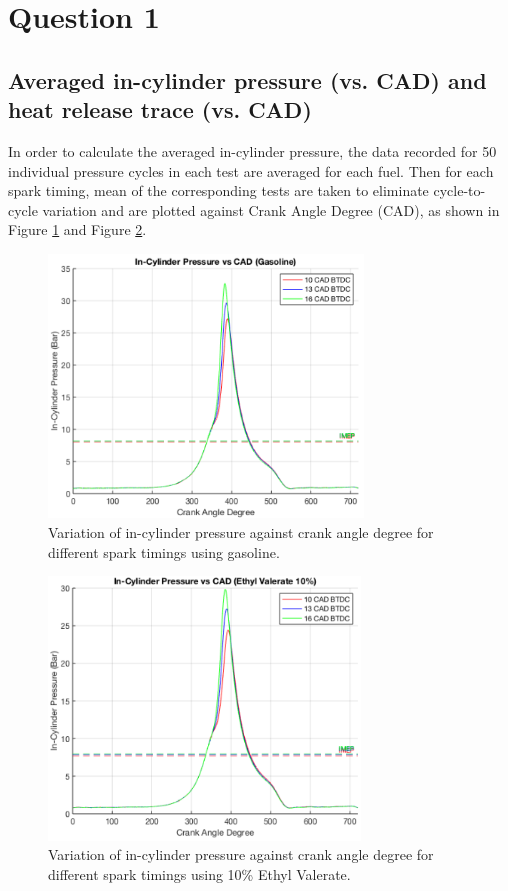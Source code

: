 \documentclass[11pt]{article}
\begin{document}
\section{Question 1}
\subsection*{Averaged in-cylinder pressure (vs. CAD) and heat release trace (vs. CAD)}
In order to calculate the averaged in-cylinder pressure, the data recorded for 50 individual pressure cycles in each test are averaged for each fuel. Then for each spark timing, mean of the corresponding tests are taken to eliminate cycle-to-cycle variation and are plotted against Crank Angle Degree (CAD), as shown in Figure \ref{q1-f1} and Figure \ref{q1-f2}. 
\begin{figure}[H]
    \centering
    \includegraphics[height = 7cm]{./img/diagram8.png}
    \caption{Variation of in-cylinder pressure against crank angle degree for different spark timings using gasoline.}
    \label{q1-f1}
\end{figure}
\begin{figure}[H]
    \centering
    \includegraphics[height = 7cm]{./img/diagram9.png}
    \caption{Variation of in-cylinder pressure against crank angle degree for different spark timings using 10\% Ethyl Valerate.}
    \label{q1-f2}
\end{figure}
\end{document}
